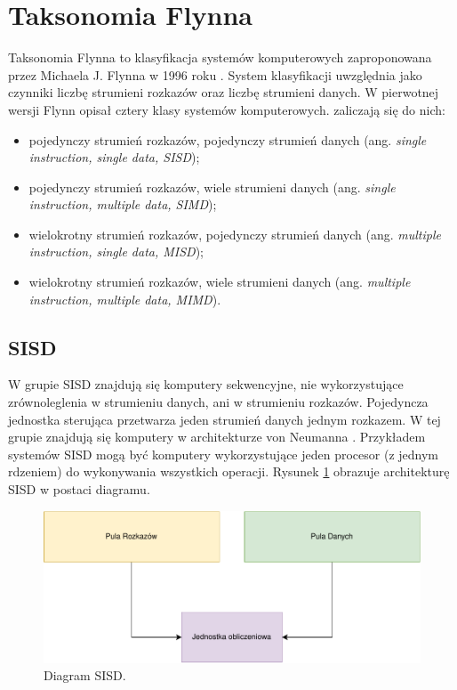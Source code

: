 \documentclass[a4paper,12pt]{book} %
\begin{document}
\section{Taksonomia Flynna}
Taksonomia Flynna to klasyfikacja systemów komputerowych zaproponowana przez Michaela J. Flynna w 1996 roku \cite{Flynn1966}. System klasyfikacji uwzględnia jako czynniki liczbę strumieni rozkazów oraz liczbę strumieni danych.
W pierwotnej wersji Flynn opisał cztery klasy systemów komputerowych. zaliczają się do nich:
\begin{itemize}[topsep=1pt, itemsep=0.5pt]
	\item pojedynczy strumień rozkazów, pojedynczy strumień danych (ang. \emph{single instruction, single data, SISD});
	\item pojedynczy strumień rozkazów, wiele strumieni danych (ang. \emph{single instruction, multiple data, SIMD});
	\item wielokrotny strumień rozkazów, pojedynczy strumień danych (ang. \emph{multiple instruction, single data, MISD});
	\item wielokrotny strumień rozkazów, wiele strumieni danych (ang. \emph{multiple instruction, multiple data, MIMD}).
\end{itemize}

\subsection{SISD}
W grupie SISD znajdują się komputery sekwencyjne, nie wykorzystujące zrównoleglenia w strumieniu danych, ani w strumieniu rozkazów. Pojedyncza jednostka sterująca przetwarza jeden strumień danych jednym rozkazem. W tej grupie znajdują się komputery w architekturze von Neumanna \cite{Neumann}. Przykładem systemów SISD mogą być komputery wykorzystujące jeden procesor (z jednym rdzeniem) do wykonywania wszystkich operacji. Rysunek \ref{fig:sisd} obrazuje architekturę SISD w postaci diagramu.
\begin{figure}
	\centering
	\includegraphics[scale=1]{assets/SISD.pdf}
	\caption{Diagram SISD.}
	\label{fig:sisd}
\end{figure}
\end{document}

